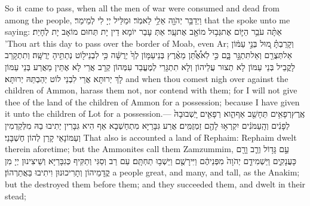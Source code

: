 {So it came to pass, when all the men of war were consumed and dead from among the people,}{}
{וַיְדַבֵּ֥ר יְהֹוָ֖ה אֵלַ֥י לֵאמֹֽר׃}
{וּמַלֵּיל יְיָ לִי לְמֵימַר׃}
{that the \lord\space spoke unto me saying:}{}
{אַתָּ֨ה עֹבֵ֥ר הַיּ֛וֹם אֶת\maqqaf גְּב֥וּל מוֹאָ֖ב אֶת\maqqaf עָֽר׃}
{אַתְּ עָבַר יוֹמָא דֵין יָת תְּחוּם מוֹאָב יָת לְחָיַת׃}
{’Thou art this day to pass over the border of Moab, even Ar;}{}
{וְקָרַבְתָּ֗ מ֚וּל בְּנֵ֣י עַמּ֔וֹן אַל\maqqaf תְּצֻרֵ֖ם וְאַל\maqqaf תִּתְגָּ֣ר בָּ֑ם כִּ֣י לֹֽא\maqqaf אֶ֠תֵּ֠ן מֵאֶ֨רֶץ בְּנֵי\maqqaf עַמּ֤וֹן לְךָ֙ יְרֻשָּׁ֔ה כִּ֥י לִבְנֵי\maqqaf ל֖וֹט נְתַתִּ֥יהָ יְרֻשָּֽׁה׃}
{וְתִתְקָרַב לָקֳבֵיל בְּנֵי עַמּוֹן לָא תְצוּר עֲלֵיהוֹן וְלָא תִתְגָּרֵי לְמֶעֱבַד עִמְּהוֹן קְרָב אֲרֵי לָא אֶתֵּין מֵאֲרַע בְּנֵי עַמּוֹן לָךְ יְרוּתָּא אֲרֵי לִבְנֵי לוֹט יְהַבְתַּהּ יְרוּתָּא׃}
{and when thou comest nigh over against the children of Ammon, harass them not, nor contend with them; for I will not give thee of the land of the children of Ammon for a possession; because I have given it unto the children of Lot for a possession.—}{}
{אֶֽרֶץ\maqqaf רְפָאִ֥ים תֵּחָשֵׁ֖ב אַף\maqqaf הִ֑וא רְפָאִ֤ים יָֽשְׁבוּ\maqqaf בָהּ֙ לְפָנִ֔ים וְהָֽעַמֹּנִ֔ים יִקְרְא֥וּ לָהֶ֖ם זַמְזֻמִּֽים׃}
{אֲרַע גִּבָּרַיָּא מִתְחַשְׁבָא אַף הִיא גִּבָּרִין יְתִיבוּ בַהּ מִלְּקַדְמִין וְעַמּוֹנָאֵי קָרַן לְהוֹן חֶשְׁבָּנֵי׃}
{That also is accounted a land of Rephaim: Rephaim dwelt therein aforetime; but the Ammonites call them Zamzummim,}{}
{עַ֣ם גָּד֥וֹל וְרַ֛ב וָרָ֖ם כָּעֲנָקִ֑ים וַיַּשְׁמִידֵ֤ם יְהֹוָה֙ מִפְּנֵיהֶ֔ם וַיִּירָשֻׁ֖ם וַיֵּשְׁב֥וּ תַחְתָּֽם׃}
{עַם רַב וְסַגִּי וְתַקִּיף כְּגִבָּרַיָּא וְשֵׁיצִינוּן יְיָ מִן קֳדָמֵיהוֹן וְתָרִיכוּנוּן וִיתִיבוּ בַּאֲתַרְהוֹן׃}
{a people great, and many, and tall, as the Anakim; but the \lord\space destroyed them before them; and they succeeded them, and dwelt in their stead;}{}
